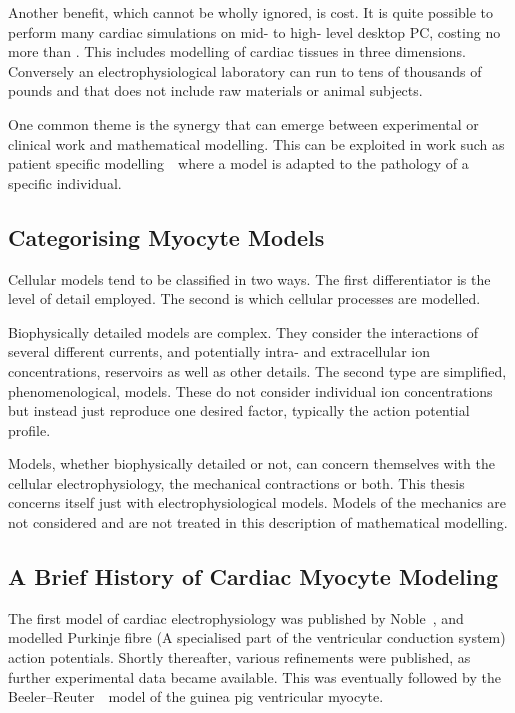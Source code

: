 Another benefit, which cannot be wholly ignored, is cost.
It is quite possible to perform many cardiac simulations on mid- to high- level
desktop PC, costing no more than .
This includes modelling of cardiac tissues in three dimensions.
Conversely an electrophysiological laboratory can run to tens of thousands of
pounds and that does not include raw materials or animal subjects.

One common theme is the synergy that can emerge between experimental or clinical
work and mathematical modelling.
This can be exploited in work such as patient specific
modelling~\cite{Sermesant2006,Ramanathan2006}\ where a model is adapted to the pathology of a
specific individual.

\subsection{Categorising Myocyte Models}

Cellular models tend to be classified in two ways.
The first differentiator is the level of detail employed.
The second is which cellular processes are modelled.

Biophysically detailed models are complex.
They consider the interactions of several different currents, and potentially
intra- and extracellular ion concentrations, reservoirs as well as other
details.
The second type are simplified, phenomenological, models.
These do not consider individual ion concentrations but instead just reproduce
one desired factor, typically the action potential profile.

Models, whether biophysically detailed or not, can concern themselves with the
cellular electrophysiology, the mechanical contractions or both.
This thesis concerns itself just with electrophysiological models.
Models of the mechanics are not considered and are not treated in this
description of mathematical modelling.

\subsection{A Brief History of Cardiac Myocyte Modeling}

The first model of cardiac electrophysiology was published by
Noble~\cite{Noble1962}, and modelled Purkinje fibre (A specialised part of the
ventricular conduction system) action potentials.
Shortly thereafter, various refinements were published, as further experimental
data became available.
This was eventually followed by the Beeler--Reuter~\cite{Beeler1977}\ model of
the guinea pig ventricular myocyte.

